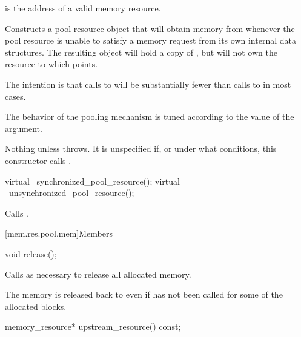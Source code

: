 \begin{itemdescr}
\pnum
\requires
{} is the address of a valid memory resource.

\pnum
\effects
Constructs a pool resource object that will obtain memory from 
whenever the pool resource is unable to satisfy a memory request
from its own internal data structures.
The resulting object will hold a copy of ,
but will not own the resource to which  points.
\begin{note}
The intention is that calls to 
will be substantially fewer than calls to 
in most cases.
\end{note}
The behavior of the pooling mechanism is tuned
according to the value of the  argument.

\pnum
\throws
Nothing unless  throws.
It is unspecified if, or under what conditions,
this constructor calls .
\end{itemdescr}

%
%
\begin{itemdecl}
virtual ~synchronized_pool_resource();
virtual ~unsynchronized_pool_resource();
\end{itemdecl}

\begin{itemdescr}
\pnum
\effects
Calls .
\end{itemdescr}

[mem.res.pool.mem]{Members}

%
%
\begin{itemdecl}
void release();
\end{itemdecl}

\begin{itemdescr}
\pnum
\effects
Calls  as necessary
to release all allocated memory.
\begin{note}
The memory is released back to 
even if  has not been called
for some of the allocated blocks.
\end{note}
\end{itemdescr}

%
%
\begin{itemdecl}
memory_resource* upstream_resource() const;
\end{itemdecl}

